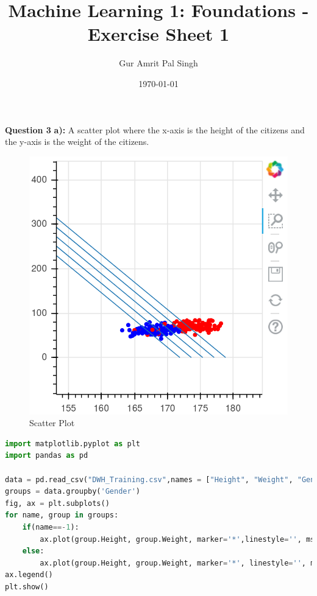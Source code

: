 \documentclass{article}
\title{Machine Learning 1: Foundations - Exercise Sheet 1}
\author{Gur Amrit Pal Singh }
\date{\today}
\begin{document}
\maketitle

\noindent\textbf{Question 3}\newline
\textbf{a):} A scatter plot where the x-axis is the height of the citizens and the y-axis is the weight of the citizens.
\begin{figure}[H]
\centering
    \includegraphics[scale=0.6]{Question3.png}
\caption{Scatter Plot}
\label{fig:scatter_plot1}
\end{figure}
\begin{lstlisting}[language=Python]
import matplotlib.pyplot as plt
import pandas as pd

data = pd.read_csv("DWH_Training.csv",names = ["Height", "Weight", "Gender"])
groups = data.groupby('Gender')
fig, ax = plt.subplots()
for name, group in groups:
    if(name==-1):
        ax.plot(group.Height, group.Weight, marker='*',linestyle='', ms=12, label='Female')
    else:
        ax.plot(group.Height, group.Weight, marker='*', linestyle='', ms=12, label='Male')
ax.legend()
plt.show()
\end{lstlisting}\\
\\~\\
\\~\\
\end{document}
